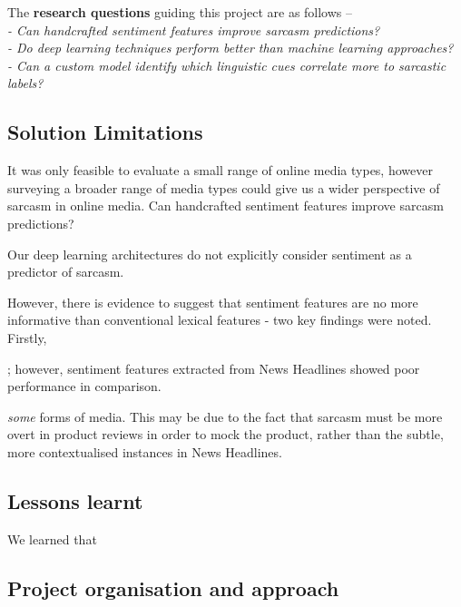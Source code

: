 \documentclass[12pt,a4paper]{article}
\begin{document}
\noindent The \textbf{research questions} guiding this project are as follows --\\
\indent \textit{- Can handcrafted sentiment features improve sarcasm predictions?}\\ 
\indent \textit{- Do deep learning techniques perform better than machine learning approaches?}\\ 
\indent \textit{- Can a custom model identify which linguistic cues correlate more to sarcastic labels?}\\





\subsection{Solution Limitations}\vspace{-10pt}
It was only feasible to evaluate a small range of online media types, however surveying a broader range of media types could give us a wider perspective of sarcasm in online media.
Can handcrafted sentiment features improve sarcasm predictions?

Our deep learning architectures do not explicitly consider sentiment as a predictor of sarcasm.

However, there is evidence to suggest that sentiment features 
are no more informative than conventional lexical features - two key findings were noted. Firstly,  

; however, sentiment features extracted from News Headlines showed poor performance in comparison. 

\textit{some} forms of media. This may be due to the fact that sarcasm must be more overt in product reviews in order to mock the product, rather than the subtle, more contextualised instances in News Headlines.


\subsection{Lessons learnt}\vspace{-10pt}
We learned that 


\subsection{Project organisation and approach}\vspace{-10pt}




\end{document}

